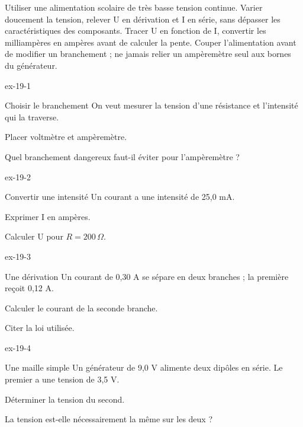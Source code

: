 \begin{experience}Utiliser une alimentation scolaire de très basse tension continue. Varier doucement la tension, relever U en dérivation et I en série, sans dépasser les caractéristiques des composants. Tracer U en fonction de I, convertir les milliampères en ampères avant de calculer la pente. Couper l'alimentation avant de modifier un branchement ; ne jamais relier un ampèremètre seul aux bornes du générateur.\end{experience}
\exercices
{}
\begin{blocLivre}{ex-19-1}\begin{exercice}[1]{Choisir le branchement}
On veut mesurer la tension d’une résistance et l’intensité qui la traverse.
\begin{questions}
\item Placer voltmètre et ampèremètre.
\item Quel branchement dangereux faut-il éviter pour l’ampèremètre ?
\end{questions}
\end{exercice}\end{blocLivre}
\begin{blocLivre}{ex-19-2}\begin{exercice}[1]{Convertir une intensité}
Un courant a une intensité de 25,0 mA.
\begin{questions}
\item Exprimer I en ampères.
\item Calculer U pour $R=200\,\Omega$.
\end{questions}
\end{exercice}\end{blocLivre}
\begin{blocLivre}{ex-19-3}\begin{exercice}[1]{Une dérivation}
Un courant de 0,30 A se sépare en deux branches ; la première reçoit 0,12 A.
\begin{questions}
\item Calculer le courant de la seconde branche.
\item Citer la loi utilisée.
\end{questions}
\end{exercice}\end{blocLivre}
\begin{blocLivre}{ex-19-4}\begin{exercice}[1]{Une maille simple}
Un générateur de 9,0 V alimente deux dipôles en série. Le premier a une tension de 3,5 V.
\begin{questions}
\item Déterminer la tension du second.
\item La tension est-elle nécessairement la même sur les deux ?
\end{questions}
\end{exercice}\end{blocLivre}
